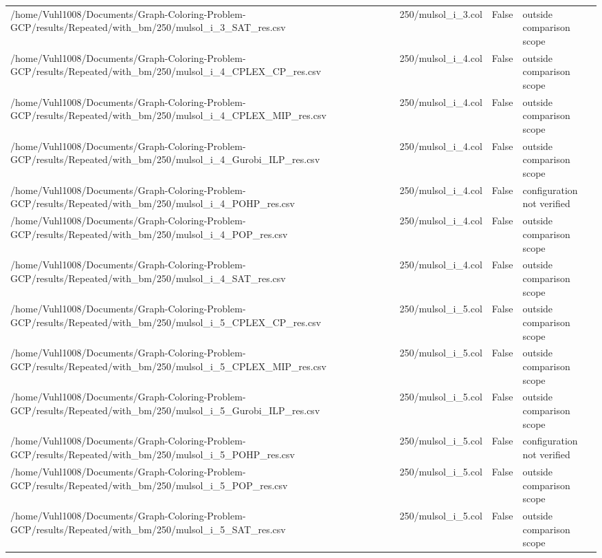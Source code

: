 \begin{table}[htbp]
\begin{tabular}{llll}
/home/Vuhl1008/Documents/Graph-Coloring-Problem-GCP/results/Repeated/with\_bm/250/mulsol\_i\_3\_SAT\_res.csv & 250/mulsol\_i\_3.col & False & outside comparison scope \\
/home/Vuhl1008/Documents/Graph-Coloring-Problem-GCP/results/Repeated/with\_bm/250/mulsol\_i\_4\_CPLEX\_CP\_res.csv & 250/mulsol\_i\_4.col & False & outside comparison scope \\
/home/Vuhl1008/Documents/Graph-Coloring-Problem-GCP/results/Repeated/with\_bm/250/mulsol\_i\_4\_CPLEX\_MIP\_res.csv & 250/mulsol\_i\_4.col & False & outside comparison scope \\
/home/Vuhl1008/Documents/Graph-Coloring-Problem-GCP/results/Repeated/with\_bm/250/mulsol\_i\_4\_Gurobi\_ILP\_res.csv & 250/mulsol\_i\_4.col & False & outside comparison scope \\
/home/Vuhl1008/Documents/Graph-Coloring-Problem-GCP/results/Repeated/with\_bm/250/mulsol\_i\_4\_POHP\_res.csv & 250/mulsol\_i\_4.col & False & configuration not verified \\
/home/Vuhl1008/Documents/Graph-Coloring-Problem-GCP/results/Repeated/with\_bm/250/mulsol\_i\_4\_POP\_res.csv & 250/mulsol\_i\_4.col & False & outside comparison scope \\
/home/Vuhl1008/Documents/Graph-Coloring-Problem-GCP/results/Repeated/with\_bm/250/mulsol\_i\_4\_SAT\_res.csv & 250/mulsol\_i\_4.col & False & outside comparison scope \\
/home/Vuhl1008/Documents/Graph-Coloring-Problem-GCP/results/Repeated/with\_bm/250/mulsol\_i\_5\_CPLEX\_CP\_res.csv & 250/mulsol\_i\_5.col & False & outside comparison scope \\
/home/Vuhl1008/Documents/Graph-Coloring-Problem-GCP/results/Repeated/with\_bm/250/mulsol\_i\_5\_CPLEX\_MIP\_res.csv & 250/mulsol\_i\_5.col & False & outside comparison scope \\
/home/Vuhl1008/Documents/Graph-Coloring-Problem-GCP/results/Repeated/with\_bm/250/mulsol\_i\_5\_Gurobi\_ILP\_res.csv & 250/mulsol\_i\_5.col & False & outside comparison scope \\
/home/Vuhl1008/Documents/Graph-Coloring-Problem-GCP/results/Repeated/with\_bm/250/mulsol\_i\_5\_POHP\_res.csv & 250/mulsol\_i\_5.col & False & configuration not verified \\
/home/Vuhl1008/Documents/Graph-Coloring-Problem-GCP/results/Repeated/with\_bm/250/mulsol\_i\_5\_POP\_res.csv & 250/mulsol\_i\_5.col & False & outside comparison scope \\
/home/Vuhl1008/Documents/Graph-Coloring-Problem-GCP/results/Repeated/with\_bm/250/mulsol\_i\_5\_SAT\_res.csv & 250/mulsol\_i\_5.col & False & outside comparison scope \\

\end{tabular}
\end{table}
